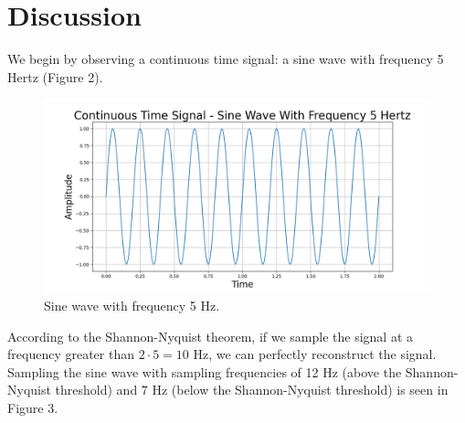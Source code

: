 \documentclass{article}
\begin{document}
\section{Discussion}


We begin by observing a continuous time signal: a sine wave with frequency 5 Hertz (Figure 2). 
\begin{figure}[H]
    \includegraphics[width=\linewidth]{images/sinewave_5hz.png}
    \caption{Sine wave with frequency 5 Hz.}
    \label{fig:enter-label}
\end{figure}
According to the Shannon-Nyquist theorem, if we sample the signal at a frequency greater than $2\cdot 5 = 10$ Hz, we can perfectly reconstruct the signal.
Sampling the sine wave with sampling frequencies of 12 Hz (above the Shannon-Nyquist threshold) and 7 Hz (below the Shannon-Nyquist threshold) is seen in Figure 3.
\end{document}
